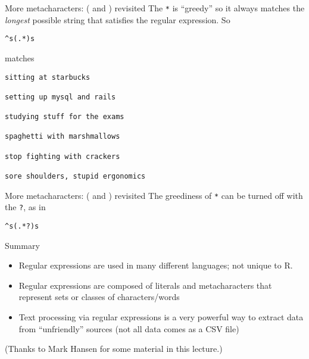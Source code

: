 \documentclass[aspectratio=169]{beamer}
\begin{document}
\begin{frame}[fragile]{More metacharacters: ( and ) revisited}
The \verb+*+ is ``greedy'' so it always matches the \textit{longest}
possible string that satisfies the regular expression. So
\begin{verbatim}
^s(.*)s
\end{verbatim}
matches
\begin{verbatim}
sitting at starbucks

setting up mysql and rails

studying stuff for the exams

spaghetti with marshmallows

stop fighting with crackers

sore shoulders, stupid ergonomics
\end{verbatim}
\end{frame}

\begin{frame}[fragile]{More metacharacters: ( and ) revisited}
The greediness of \verb+*+ can be turned off with the \verb+?+, as in
\begin{verbatim}
^s(.*?)s
\end{verbatim}
\end{frame}


\begin{frame}{Summary}
\begin{itemize}
\item Regular expressions are used in many different languages; not
  unique to R.
\item Regular expressions are composed of literals and metacharacters
  that represent sets or classes of characters/words
\item Text processing via regular expressions is a very powerful way
  to extract data from ``unfriendly'' sources (not all data comes as a
  CSV file)
\end{itemize}
(Thanks to Mark Hansen for some material in this lecture.)
\end{frame}
\end{document}

